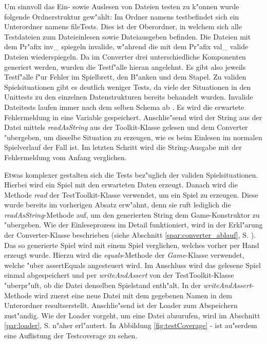 Um sinnvoll das Ein- sowie Auslesen von Dateien testen zu k"onnen wurde folgende Ordnerstruktur gew"ahlt: Im Ordner namens \glqq test\grqq befindet sich ein Unterordner namens \glqq fileTests\grqq {}. Dies ist der Oberordner, in welchem sich alle Testdateien zum Dateieinlesen sowie Dateiausgeben befinden. Die Dateien mit dem Pr"afix \glqq inv\_\grqq {} spiegeln invalide, w"ahrend die mit dem Pr"afix \glqq val\_\grqq {} valide Dateien wiederspiegeln. Da im Converter drei unterschiedliche Komponenten generiert werden, wurden die Testf"alle hieran angelehnt. Es gibt also jeweils Testf"alle f"ur Fehler im Spielbrett, den B"anken und dem Stapel. Zu validen Spielsituationen gibt es deutlich weniger Tests, da viele der Situationen in den Unittests zu den einzelnen Datenstrukturen bereits behandelt wurden. Invalide Dateitests laufen immer nach dem selben Schema ab . Es wird die erwartete Fehlermeldung in eine Variable gespeichert. Anschlie"send wird der String aus der Datei mittels \emph{readAsString} aus der Toolkit-Klasse gelesen und dem Converter "ubergeben, um dieselbe Situation zu erzeugen, wie es beim Einlesen im normalen Spielverlauf der Fall ist. Im letzten Schritt wird die String-Ausgabe mit der Fehlermeldung vom Anfang verglichen. 

Etwas komplexer gestalten sich die Tests bez"uglich der validen Spielsituationen. Hierbei wird ein Spiel mit den erwarteten Daten erzeugt. Danach wird die Methode \emph{read} der TestToolkit-Klasse verwendet, um ein Spiel zu erzeugen. Diese wurde bereits im vorherigen Absatz erw"ahnt, denn sie ruft lediglich die \emph{readAsString}-Methode auf, um den generierten String dem Game-Konstruktor zu "ubergeben. Wie der Einleseprozess im Detail funktioniert, wird in der Erkl"arung der Converter-Klasse beschrieben (siehe Abschnitt \ref{spar:converter_ablauf}, S. \pageref{spar:converter_ablauf}). Das so generierte Spiel wird mit einem Spiel verglichen, welches vorher \glqq per Hand\grqq {} erzeugt wurde. Hierzu wird die \emph{equals}-Methode der \emph{Game}-Klasse verwendet, welche "uber assertEquals angesteuert wird. Im Anschluss wird das gelesene Spiel einmal abgespeichert und per \emph{writeAndAssert} von der TestToolkit-Klasse "uberpr"uft, ob die Datei denselben Spielstand enth"alt. In der \emph{writeAndAssert}-Methode wird zuerst eine neue Datei mit dem gegebenen Namen in dem Unterordner \glqq results\grqq  erstellt. Anschlie"send ist der Loader zum Abspeichern zust"andig. Wie der Loader vorgeht, um eine Datei abzurufen, wird im Abschnitt \ref{par:loader}, S. \pageref{par:loader} n"aher erl"autert. 
In Abbildung \ref{fig:testCoverage} -  ist au"serdem eine Auflistung der Testcoverage zu sehen.

